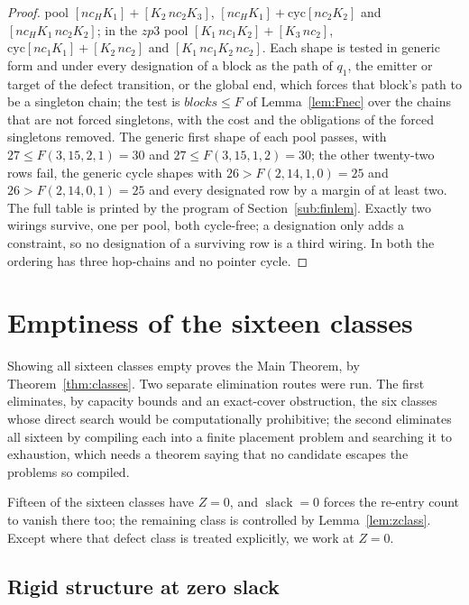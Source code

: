 \documentclass[10pt]{article}
\theoremstyle{remark}
\theoremstyle{plain}
\newcommand{\slack}{\operatorname{slack}}
\begin{document}
\begin{proof}
pool $[\mathit{nc}_H K_1]+[K_2\,\mathit{nc}_2 K_3]$,
$[\mathit{nc}_H K_1]+\mathrm{cyc}[\mathit{nc}_2 K_2]$ and
$[\mathit{nc}_H K_1\,\mathit{nc}_2 K_2]$; in the $zp3$ pool
$[K_1\,\mathit{nc}_1 K_2]+[K_3\,\mathit{nc}_2]$,
$\mathrm{cyc}[\mathit{nc}_1 K_1]+[K_2\,\mathit{nc}_2]$ and
$[K_1\,\mathit{nc}_1 K_2\,\mathit{nc}_2]$.  Each shape is tested in
generic form and under every designation of a block as the path of
$q_1$, the emitter or target of the defect transition, or the global
end, which forces that block's path to be a singleton chain; the test is $\mathit{blocks}\le F$ of Lemma~\ref{lem:Fnec} over
the chains that are not forced singletons, with the cost and the
obligations of the forced singletons removed.  The generic first shape
of each pool passes, with $27\le F(3,15,2,1)=30$ and
$27\le F(3,15,1,2)=30$; the other twenty-two rows fail,
the generic cycle shapes with $26>F(2,14,1,0)=25$ and
$26>F(2,14,0,1)=25$ and every designated row by a margin of at least
two.  The full table is printed by the program of
Section~\ref{sub:finlem}.  Exactly two wirings survive, one per pool,
both cycle-free; a designation only adds a constraint, so no
designation of a surviving row is a third wiring.  In both the
ordering has three hop-chains and no pointer cycle.
\end{proof}

\section{Emptiness of the sixteen classes}\label{sec:empty}

Showing all sixteen classes empty proves the Main Theorem, by
Theorem~\ref{thm:classes}.  Two separate elimination routes were run.
The first eliminates, by capacity bounds and an exact-cover
obstruction, the six classes whose direct search would be
computationally prohibitive; the second eliminates all sixteen by
compiling each into a finite placement problem and searching it to
exhaustion, which needs a theorem saying that no candidate escapes the
problems so compiled.

Fifteen of the sixteen classes have $Z=0$, and $\slack=0$ forces the
re-entry count to vanish there too; the remaining class is controlled by
Lemma~\ref{lem:zclass}.  Except where that defect class is treated
explicitly, we work at $Z=0$.

\subsection{Rigid structure at zero slack}
\end{document}
